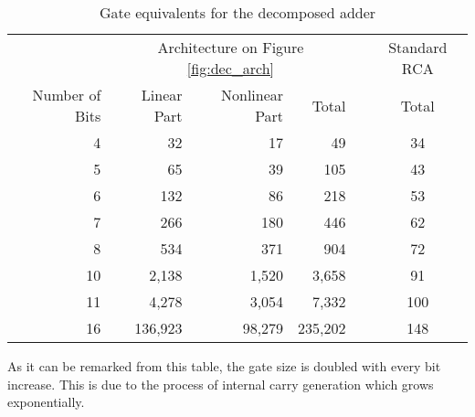 \documentclass[a4paper]{article}
\begin{document}
\begin{table}
   \centering
        \caption{Gate equivalents for the decomposed adder}
				\vspace{6pt}
        \begin{tabular}{rrrrcc}
				\toprule
				& \multicolumn{3}{c}{Architecture on Figure \ref{fig:dec_arch}} && Standard RCA \\
                Number of Bits & Linear Part &  Nonlinear Part & Total && Total\\
                \midrule
                4  &  32     &	17	    &	49      && \phantom{1}34 \\
                5  &  65     &	39	    &	105     && \phantom{1}43 \\  
                6  &  132    &	86	    &	218     && \phantom{1}53  \\  
                7  &  266    &	180	    &	446     && \phantom{1}62  \\  
                8  &  534    &	371	    &	904     && \phantom{1}72  \\  
                10 &  2,138   &	1,520    &	3,658    && \phantom{1}91  \\  
                11 &  4,278   &	3,054	  &	7,332    && 100  \\  
                16 &  136,923 &	98,279	  &	235,202  && 148  \\  
                \bottomrule
        \end{tabular}
        \label{tab:asic_areas}
\end{table}



As it can be remarked from this table, the gate size is doubled with every bit increase. This is due to the process of internal carry generation which grows exponentially.
\end{document}
